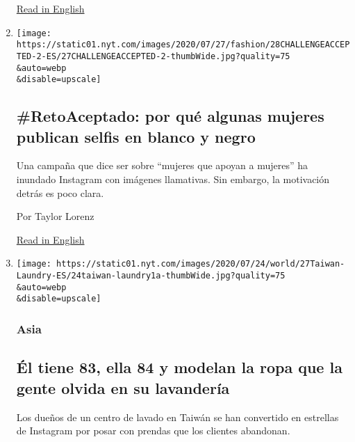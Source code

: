 \begin{enumerate}
  \href{https://www.nytimes.com/2020/07/27/world/europe/france-alsace-wine-coronavirus.html}{Read
  in English}
\item
  \href{/es/2020/07/28/espanol/estilos-de-vida/reto-selfi-blanco-negro.html}{}

  \texttt{[image: https://static01.nyt.com/images/2020/07/27/fashion/28CHALLENGEACCEPTED-2-ES/27CHALLENGEACCEPTED-2-thumbWide.jpg?quality=75\\\&auto=webp\\\&disable=upscale]}

  \hypertarget{retoaceptado-por-quuxe9-algunas-mujeres-publican-selfis-en-blanco-y-negro}{%
  \subsection{\#RetoAceptado: por qué algunas mujeres publican selfis en
  blanco y
  negro}\label{retoaceptado-por-quuxe9-algunas-mujeres-publican-selfis-en-blanco-y-negro}}

  Una campaña que dice ser sobre ``mujeres que apoyan a mujeres'' ha
  inundado Instagram con imágenes llamativas. Sin embargo, la motivación
  detrás es poco clara.

  Por Taylor Lorenz

  \href{https://www.nytimes.com/2020/07/27/style/challenge-accepted-instagram.html}{Read
  in English}
\item
  \href{/es/2020/07/28/espanol/mundo/lavanderia-taiwanesa-instagram.html}{}

  \texttt{[image: https://static01.nyt.com/images/2020/07/24/world/27Taiwan-Laundry-ES/24taiwan-laundry1a-thumbWide.jpg?quality=75\\\&auto=webp\\\&disable=upscale]}

  \hypertarget{asia}{%
  \subsubsection{Asia}\label{asia}}

  \hypertarget{uxe9l-tiene-83-ella-84-y-modelan-la-ropa-que-la-gente-olvida-en-su-lavanderuxeda}{%
  \subsection{Él tiene 83, ella 84 y modelan la ropa que la gente olvida
  en su
  lavandería}\label{uxe9l-tiene-83-ella-84-y-modelan-la-ropa-que-la-gente-olvida-en-su-lavanderuxeda}}

  Los dueños de un centro de lavado en Taiwán se han convertido en
  estrellas de Instagram por posar con prendas que los clientes
  abandonan.


\end{enumerate}
